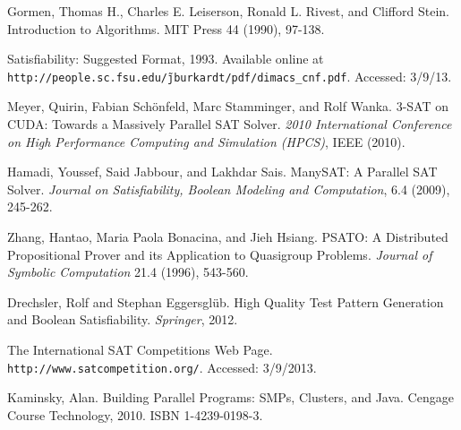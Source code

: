 \documentclass[paper=a4, fontsize=11pt]{scrartcl} %
\begin{document}
\begin{thebibliography}{9}

 Gormen, Thomas H., Charles E. Leiserson, Ronald L. Rivest, and Clifford Stein. Introduction to Algorithms. MIT Press 44 (1990), 97-138.

 Satisfiability: Suggested Format, 1993. Available online at \\
{\tt http://people.sc.fsu.edu/\~jburkardt/pdf/dimacs\_cnf.pdf}. Accessed: 3/9/13.

 Meyer, Quirin, Fabian Sch\"{o}nfeld, Marc Stamminger, and Rolf Wanka. 3-SAT on CUDA: Towards a Massively Parallel SAT Solver. \emph{2010 International Conference on High Performance Computing and Simulation (HPCS)}, IEEE (2010).

 Hamadi, Youssef, Said Jabbour, and Lakhdar Sais. ManySAT: A Parallel SAT Solver. \emph{Journal on Satisfiability, Boolean Modeling and Computation}, 6.4 (2009), 245-262.

 Zhang, Hantao, Maria Paola Bonacina, and Jieh Hsiang. PSATO: A Distributed Propositional Prover and its Application to Quasigroup Problems. \emph{Journal of Symbolic Computation} 21.4 (1996), 543-560.

 Drechsler, Rolf and Stephan Eggersgl\"{u}b. High Quality Test Pattern Generation and Boolean Satisfiability. \emph{Springer}, 2012.

 The International SAT Competitions Web Page. {\tt http://www.satcompetition.org/}. Accessed: 3/9/2013.

 Kaminsky, Alan. Building Parallel Programs: SMPs, Clusters, and Java. Cengage Course Technology, 2010. ISBN 1-4239-0198-3.

\end{thebibliography}
\end{document}
